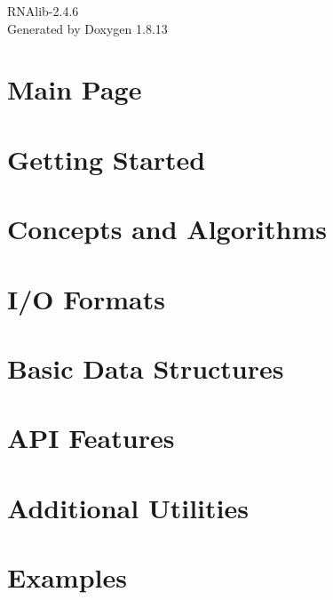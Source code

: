 \documentclass[twoside]{book}
\newcommand{\+}{\discretionary{\mbox{\scriptsize$\hookleftarrow$}}{}{}}
\newcommand{\clearemptydoublepage}{%
  \newpage{\pagestyle{empty}\cleardoublepage}%
}
\begin{document}
\hypersetup{pageanchor=false,
             bookmarksnumbered=true,
             pdfencoding=unicode
            }
\begin{titlepage}
\vspace*{7cm}
\begin{center}%
{\Large R\+N\+Alib-\/2.4.6 }\\
\vspace*{1cm}
{\large Generated by Doxygen 1.8.13}\\
\end{center}
\end{titlepage}
\clearemptydoublepage
{}
\tableofcontents
\clearemptydoublepage
{}
\hypersetup{pageanchor=true}

\chapter{Main Page}
\label{index}\hypertarget{index}{}
\chapter{Getting Started}
\label{getting_started}

\chapter{Concepts and Algorithms}
\label{concepts}

\chapter{I/O Formats}
\label{io}

\chapter{Basic Data Structures}
\label{data_structures}

\chapter{A\+PI Features}
\label{api_features}

\chapter{Additional Utilities}
\label{utilities}

\chapter{Examples}
\label{examples}

\end{document}
